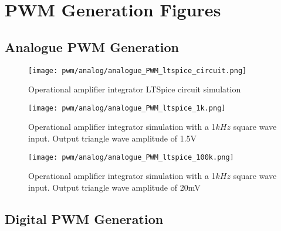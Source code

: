 \chapter{PWM Generation Figures} \label{A:PWM}

\section*{Analogue PWM Generation} \label{A:analogue_PWM}

\begin{figure}[H]
    \begin{center}
        \texttt{[image: pwm/analog/analogue\_PWM\_ltspice\_circuit.png]}
        \caption{Operational amplifier integrator LTSpice circuit simulation}
    \end{center}
    \vspace{-10pt}
\end{figure}
    
\begin{figure}[H]
    \texttt{[image: pwm/analog/analogue\_PWM\_ltspice\_1k.png]}
    \caption{Operational amplifier integrator simulation with a 1$kHz$ square wave input. Output triangle wave amplitude of 1.5V}
    \vspace{-10pt}
\end{figure}

\begin{figure}[H]
    \texttt{[image: pwm/analog/analogue\_PWM\_ltspice\_100k.png]}
    \caption{Operational amplifier integrator simulation with a 1$kHz$ square wave input. Output triangle wave amplitude of 20mV}
    \vspace{-10pt}
\end{figure}
    

\section*{Digital PWM Generation} \label{A:digital_PWM}

